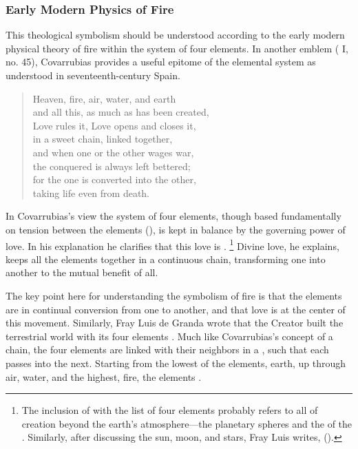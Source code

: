 \subsubsection{%
Early Modern Physics of Fire
}

This theological symbolism should be understood according to the early modern physical theory of fire within the system of four elements.
In another emblem ( I, no. 45), Covarrubias provides a useful epitome of the elemental system as understood in seventeenth-century Spain.

\begin{verse}
Heaven, fire, air, water, and earth\\
and all this, as much as has been created,\\
Love rules it, Love opens and closes it,\\
in a sweet chain, linked together,\\
and when one or the other wages war,\\
the conquered is always left bettered;\\
for the one is converted into the other,\\
taking life even from death.
\end{verse}

In Covarrubias's view the system of four elements, though based fundamentally on tension between the elements (), is kept in balance by the governing power of love.
In his explanation he clarifies that this love is .%
	\footnote{%
	The inclusion of  with the list of four elements probably refers to all of creation beyond the earth's atmosphere---the planetary spheres and the  of the . 
	Similarly, after discussing the sun, moon, and stars, Fray Luis writes, 
        (\autocite[204]{LuisdeGranada:Simbolo}).
	}
Divine love, he explains, keeps all the elements together in a continuous chain, transforming one into another to the mutual benefit of all.

The key point here for understanding the symbolism of fire is that the elements are in continual conversion from one to another, and that love is at the center of this movement.
Similarly, Fray Luis de Granda wrote that the Creator built the terrestrial world with its four elements .%
	\autocite[204]{LuisdeGranada:Simbolo}
Much like Covarrubias's concept of a chain, the four elements are linked with their neighbors in a , such that each passes into the next.
Starting from the lowest of the elements, earth, up through air, water, and the highest, fire, the elements .


